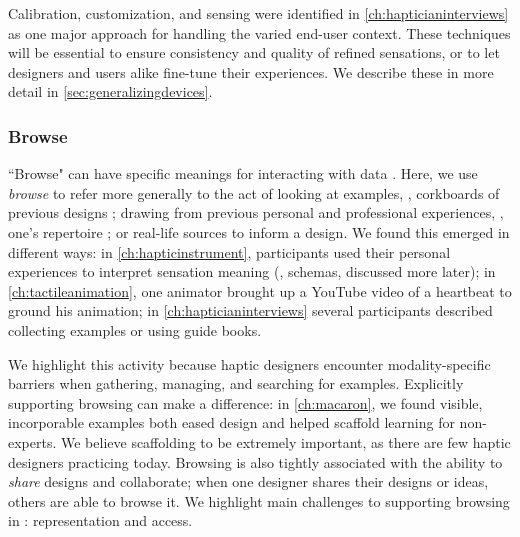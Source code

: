 
Calibration, customization, and sensing were identified in \autoref{ch:hapticianinterviews} as one major approach for handling the varied end-user context. 
These techniques will be essential to ensure consistency and quality of refined sensations, or to let designers and users alike fine-tune their experiences.
We describe these in more detail in \autoref{sec:generalizingdevices}.


%
%
\subsubsection{Browse} 
``Browse" can have specific meanings for interacting with data \cite{munzner2014visualization}.
Here, we use \emph{browse} to refer more generally to the act of looking at examples, \eg, corkboards of previous designs \cite{Buxton2007}; drawing from previous personal and professional experiences, \eg, one's repertoire \cite{Schon1982}; or real-life sources to inform a design.
We found this emerged in different ways:
in \autoref{ch:hapticinstrument}, participants used their personal experiences to interpret sensation meaning (\ie, schemas, discussed more later);
in \autoref{ch:tactileanimation}, one animator brought up a YouTube video of a heartbeat to ground his animation;
in \autoref{ch:hapticianinterviews} several participants described collecting examples or using guide books.

We highlight this activity because haptic designers encounter modality-specific barriers when gathering, managing, and searching for examples.
Explicitly supporting browsing can make a difference:
in \autoref{ch:macaron}, we found visible, incorporable examples both eased design and helped scaffold learning for non-experts.
We believe scaffolding to be extremely important, as there are few haptic designers practicing today.
Browsing is also tightly associated with the ability to \emph{share} designs and collaborate; when one designer shares their designs or ideas, others are able to browse it.
We highlight  main challenges to supporting browsing in \haxd: representation and access.



